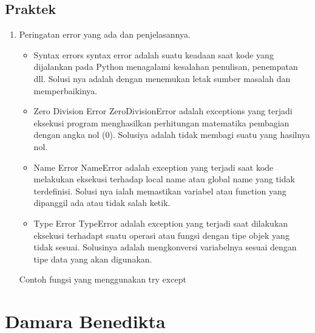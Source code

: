 \subsection{Praktek}
\begin{enumerate}
    \item Peringatan error yang ada dan penjelasannya.
    
    \begin{itemize}
    	\item Syntax errors
    	syntax error adalah suatu keadaan saat kode yang dijalankan pada Python menagalami kesalahan penulisan, penempatan dll.
    	Solusi nya adalah dengan menemukan letak sumber masalah dan memperbaikinya.
    	
    	\item Zero Division Error
    	ZeroDivisionError adalah exceptions yang terjadi eksekusi program menghasilkan perhitungan matematika pembagian dengan angka nol (0). Solusiya adalah tidak membagi suatu yang hasilnya nol.
    	\item Name Error
    	NameError adalah exception yang terjadi saat kode melakukan eksekusi terhadap local name atau global name yang tidak terdefinisi. Solusi nya ialah memastikan variabel atau function yang dipanggil ada atau tidak salah ketik.
    	\item Type Error
    	TypeError adalah exception yang terjadi saat dilakukan eksekusi terhadapt suatu operasi atau fungsi dengan tipe objek yang tidak sesuai. Solusinya adalah mengkonversi variabelnya sesuai dengan tipe data yang akan digunakan.
    \end{itemize}
    
    Contoh fungsi yang menggunakan try except
 

\end{enumerate} 
\section{Damara Benedikta}
